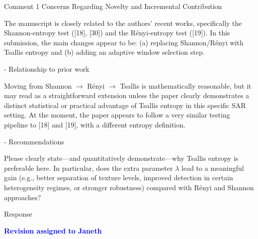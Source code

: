 \documentclass[11pt]{report}
\newcommand{\assigned}[1]{\textcolor{blue}{\textbf{#1}}}
\begin{document}
\vspace{1em}

\begin{reviewbox}{Comment 1}
Concerns Regarding Novelty and Incremental Contribution

The manuscript is closely related to the authors' recent works, specifically the Shannon-entropy test ([18], [30]) and the Rényi-entropy test ([19]). In this submission, the main changes appear to be: (a) replacing Shannon/Rényi with Tsallis entropy and (b) adding an adaptive window selection step.

- Relationship to prior work

Moving from Shannon $\rightarrow$ Rényi $\rightarrow$ Tsallis is mathematically reasonable, but it may read as a straightforward extension unless the paper clearly demonstrates a distinct statistical or practical advantage of Tsallis entropy in this specific SAR setting. At the moment, the paper appears to follow a very similar testing pipeline to [18] and [19], with a different entropy definition.

- Recommendations

Please clearly state—and quantitatively demonstrate—why Tsallis entropy is preferable here. In particular, does the extra parameter $\lambda$ lead to a meaningful gain (e.g., better separation of texture levels, improved detection in certain heterogeneity regimes, or stronger robustness) compared with Rényi and Shannon approaches?
\end{reviewbox}

\begin{responsebox}{Response}

\assigned{Revision assigned to Janeth}

\end{responsebox}

\vspace{1em}
\end{document}

